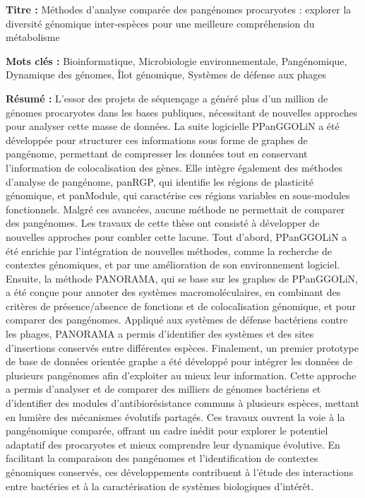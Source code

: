 \begin{mdframed}[linecolor=Prune,linewidth=1]

\textbf{Titre :} Méthodes d’analyse comparée des pangénomes procaryotes : explorer la diversité génomique inter-espèces pour une meilleure  compréhension du métabolisme

\noindent \textbf{Mots clés :} Bioinformatique, Microbiologie environnementale, Pangénomique, Dynamique des génomes, Îlot génomique, Systèmes de défense aux phages
\vspace{-12pt}
\begin{multicols}{2}
\noindent \textbf{Résumé :} L’essor des projets de séquençage a généré plus d’un million de génomes procaryotes dans les bases publiques, nécessitant de nouvelles approches pour analyser cette masse de données. La suite logicielle PPanGGOLiN a été développée pour structurer ces informations sous forme de graphes de pangénome, permettant de compresser les données tout en conservant l’information de colocalisation des gènes. Elle intègre également des méthodes d’analyse de pangénome, panRGP, qui identifie les régions de plasticité génomique, et panModule, qui caractérise ces régions variables en sous-modules fonctionnels. Malgré ces avancées, aucune méthode ne permettait de comparer des pangénomes. Les travaux de cette thèse ont consisté à développer de nouvelles approches pour combler cette lacune. Tout d’abord, PPanGGOLiN a été enrichie par l’intégration de nouvelles méthodes, comme la recherche de contextes génomiques, et par une amélioration de son environnement logiciel. Ensuite, la méthode PANORAMA, qui se base sur les graphes de PPanGGOLiN,  a été conçue pour annoter des systèmes macromoléculaires, en combinant des critères de présence/absence de fonctions et de colocalisation génomique, et pour comparer des pangénomes. Appliqué aux systèmes de défense bactériens contre les phages, PANORAMA a permis d’identifier des systèmes et des sites d’insertions conservés entre différentes espèces. Finalement, un premier prototype de base  de données orientée graphe a été développé pour intégrer les données de plusieurs pangénomes afin d’exploiter au mieux leur information. Cette approche a permis d’analyser et de comparer des milliers de génomes bactériens et d’identifier des modules d’antibiorésistance communs à plusieurs espèces, mettant en lumière des mécanismes évolutifs partagés. Ces travaux ouvrent la voie à la pangénomique comparée, offrant un cadre inédit pour explorer le potentiel adaptatif des procaryotes et mieux comprendre leur dynamique évolutive. En facilitant la comparaison des pangénomes et l’identification de contextes génomiques conservés, ces développements contribuent à l’étude des interactions entre bactéries et à la caractérisation de systèmes biologiques d’intérêt.
\end{multicols}

\end{mdframed}

